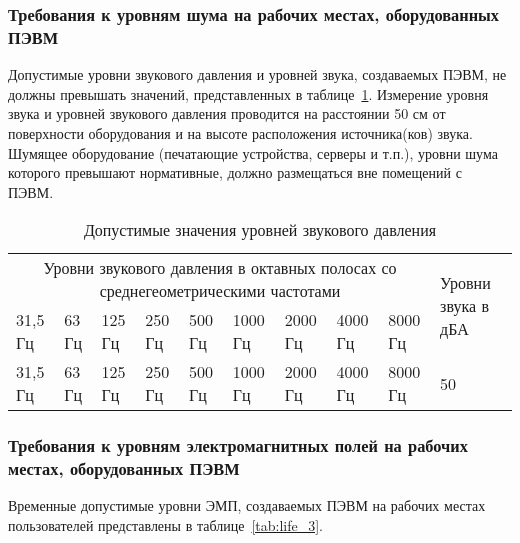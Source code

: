 \subsubsection{Требования к уровням шума на рабочих местах, оборудованных ПЭВМ}

Допустимые уровни звукового давления и уровней звука, создаваемых ПЭВМ, не должны превышать значений, 
представленных в таблице~\ref{tab:life_2}. Измерение уровня звука и уровней звукового давления 
проводится на расстоянии 50 см от поверхности оборудования и на высоте расположения 
источника(ков) звука. Шумящее оборудование (печатающие устройства, серверы и т.п.), уровни шума которого превышают нормативные, должно 
размещаться вне помещений с ПЭВМ.~\cite{sanpin_2.4.1340-03}

\begin{table}[h!]
\caption{ Допустимые значения уровней звукового давления }
\label{tab:life_2}
\begin{center}
\begin{tabularx}{\linewidth}{|X|X|X|X|X|X|X|X|X|X|}
\hline
\multicolumn{9}{|c|}{Уровни звукового давления в октавных полосах со среднегеометрическими частотами} & \multirow{2}{\hsize}{Уровни звука в дБА}\\
\cline{1-9}
31,5 Гц & 63 Гц & 125 Гц & 250 Гц & 500 Гц & 1000 Гц & 2000 Гц & 4000 Гц & 8000 Гц & \\
\hline
31,5 Гц & 63 Гц & 125 Гц & 250 Гц & 500 Гц & 1000 Гц & 2000 Гц & 4000 Гц & 8000 Гц & 50\\
\hline
\end{tabularx}
\end{center}
\end{table}




\subsubsection{Требования к уровням электромагнитных полей на рабочих местах, оборудованных ПЭВМ}

Временные допустимые уровни ЭМП, создаваемых ПЭВМ на рабочих местах пользователей
представлены в таблице~\ref{tab:life_3}.~\cite{sanpin_2.4.1340-03}

